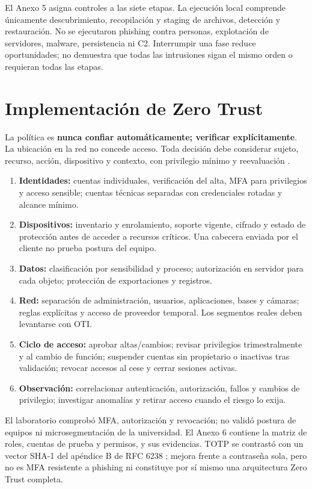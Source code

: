\documentclass[10pt,a4paper]{article}
\begin{document}
El Anexo 5 asigna controles a las siete etapas. La ejecución local comprende únicamente descubrimiento, recopilación y staging de archivos, detección y restauración. No se ejecutaron phishing contra personas, explotación de servidores, malware, persistencia ni C2. Interrumpir una fase reduce oportunidades; no demuestra que todas las intrusiones sigan el mismo orden o requieran todas las etapas.

\section{Implementación de Zero Trust}
La política es \textbf{nunca confiar automáticamente; verificar explícitamente}. La ubicación en la red no concede acceso. Toda decisión debe considerar sujeto, recurso, acción, dispositivo y contexto, con privilegio mínimo y reevaluación \cite{R04}.

\begin{enumerate}
\item \textbf{Identidades:} cuentas individuales, verificación del alta, MFA para privilegios y acceso sensible; cuentas técnicas separadas con credenciales rotadas y alcance mínimo.
\item \textbf{Dispositivos:} inventario y enrolamiento, soporte vigente, cifrado y estado de protección antes de acceder a recursos críticos. Una cabecera enviada por el cliente no prueba postura del equipo.
\item \textbf{Datos:} clasificación por sensibilidad y proceso; autorización en servidor para cada objeto; protección de exportaciones y registros.
\item \textbf{Red:} separación de administración, usuarios, aplicaciones, bases y cámaras; reglas explícitas y acceso de proveedor temporal. Los segmentos reales deben levantarse con OTI.
\item \textbf{Ciclo de acceso:} aprobar altas/cambios; revisar privilegios trimestralmente y al cambio de función; suspender cuentas sin propietario o inactivas tras validación; revocar accesos al cese y cerrar sesiones activas.
\item \textbf{Observación:} correlacionar autenticación, autorización, fallos y cambios de privilegio; investigar anomalías y retirar acceso cuando el riesgo lo exija.
\end{enumerate}
El laboratorio comprobó MFA, autorización y revocación; no validó postura de equipos ni microsegmentación de la universidad. El Anexo 6 contiene la matriz de roles, cuentas de prueba y permisos, y sus evidencias. TOTP se contrastó con un vector SHA-1 del apéndice B de RFC 6238 \cite{R22}; mejora frente a contraseña sola, pero no es MFA resistente a phishing ni constituye por sí mismo una arquitectura Zero Trust completa.
\end{document}
